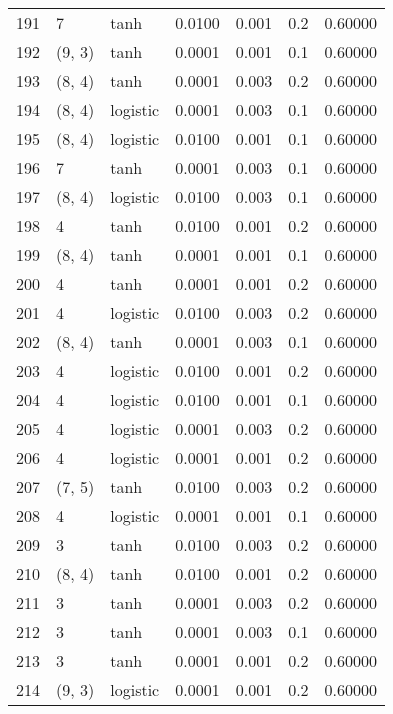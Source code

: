 \begin{tabular}{lllrrrr}
191 &           7 &      tanh &  0.0100 &  0.001 &  0.2 &   0.60000 \\
192 &      (9, 3) &      tanh &  0.0001 &  0.001 &  0.1 &   0.60000 \\
193 &      (8, 4) &      tanh &  0.0001 &  0.003 &  0.2 &   0.60000 \\
194 &      (8, 4) &  logistic &  0.0001 &  0.003 &  0.1 &   0.60000 \\
195 &      (8, 4) &  logistic &  0.0100 &  0.001 &  0.1 &   0.60000 \\
196 &           7 &      tanh &  0.0001 &  0.003 &  0.1 &   0.60000 \\
197 &      (8, 4) &  logistic &  0.0100 &  0.003 &  0.1 &   0.60000 \\
198 &           4 &      tanh &  0.0100 &  0.001 &  0.2 &   0.60000 \\
199 &      (8, 4) &      tanh &  0.0001 &  0.001 &  0.1 &   0.60000 \\
200 &           4 &      tanh &  0.0001 &  0.001 &  0.2 &   0.60000 \\
201 &           4 &  logistic &  0.0100 &  0.003 &  0.2 &   0.60000 \\
202 &      (8, 4) &      tanh &  0.0001 &  0.003 &  0.1 &   0.60000 \\
203 &           4 &  logistic &  0.0100 &  0.001 &  0.2 &   0.60000 \\
204 &           4 &  logistic &  0.0100 &  0.001 &  0.1 &   0.60000 \\
205 &           4 &  logistic &  0.0001 &  0.003 &  0.2 &   0.60000 \\
206 &           4 &  logistic &  0.0001 &  0.001 &  0.2 &   0.60000 \\
207 &      (7, 5) &      tanh &  0.0100 &  0.003 &  0.2 &   0.60000 \\
208 &           4 &  logistic &  0.0001 &  0.001 &  0.1 &   0.60000 \\
209 &           3 &      tanh &  0.0100 &  0.003 &  0.2 &   0.60000 \\
210 &      (8, 4) &      tanh &  0.0100 &  0.001 &  0.2 &   0.60000 \\
211 &           3 &      tanh &  0.0001 &  0.003 &  0.2 &   0.60000 \\
212 &           3 &      tanh &  0.0001 &  0.003 &  0.1 &   0.60000 \\
213 &           3 &      tanh &  0.0001 &  0.001 &  0.2 &   0.60000 \\
214 &      (9, 3) &  logistic &  0.0001 &  0.001 &  0.2 &   0.60000 \\

\end{tabular}
